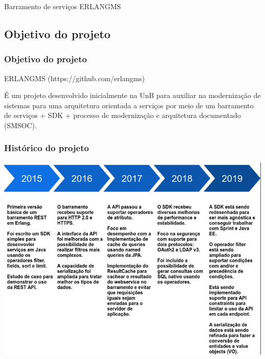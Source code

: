 \documentclass{beamer}
\begin{document}
\begin{frame}[c]{ }
\centering
\huge{Barramento de serviços ERLANGMS}
\end{frame}


\subsection{Objetivo do projeto}


\begin{frame}
\frametitle{Objetivo do projeto}

\begin{exampleblock}{ERLANGMS (https://github.com/erlangms)}
	
	É um projeto desenvolvido inicialmente na UnB para auxiliar na modernização de sistemas para uma arquitetura orientada a serviços 
	por meio de um barramento de serviços + SDK + processo 
	de modernização e arquitetura documentado (SMSOC).
	
\end{exampleblock}


\end{frame}





\begin{frame}

	\frametitle{Histórico do projeto}

	\centering
	\includegraphics[scale=0.29]{img/historico.png}

\end{frame}
\end{document}
